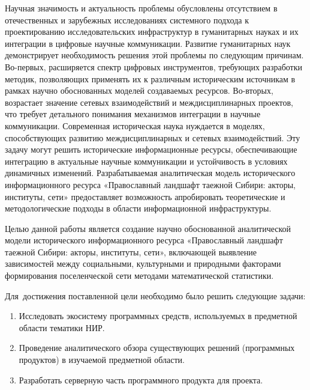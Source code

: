 
{\actuality}Научная значимость и актуальность проблемы обусловлены отсутствием в
отечественных и зарубежных исследованиях системного подхода к проектированию исследовательских инфраструктур в гуманитарных науках и их интеграции
в цифровые научные коммуникации. Развитие гуманитарных наук демонстрирует необходимость решения этой проблемы по следующим причинам. Во-первых,
расширяется спектр цифровых инструментов, требующих разработки методик,
позволяющих применять их к различным историческим источникам в рамках
научно обоснованных моделей создаваемых ресурсов. Во-вторых, возрастает значение сетевых взаимодействий и междисциплинарных проектов, что требует
детального понимания механизмов интеграции в научные коммуникации.
Современная историческая наука нуждается в моделях, способствующих
развитию междисциплинарных и сетевых взаимодействий. Эту задачу могут решить исторические информационные ресурсы, обеспечивающие интеграцию в
актуальные научные коммуникации и устойчивость в условиях динамичных изменений.
Разрабатываемая аналитическая модель исторического информационного
ресурса «Православный ландшафт таежной Сибири: акторы, институты, сети»
предоставляет возможность апробировать теоретические и методологические
подходы в области информационной инфраструктуры.


Целью данной работы является создание научно обоснованной аналитической модели исторического информационного ресурса «Православный ландшафт
таежной Сибири: акторы, институты, сети», включающей выявление зависимостей между социальными, культурными и природными факторами формирования
поселенческой сети методами математической статистики.

Для~достижения поставленной цели необходимо было решить следующие задачи:
\begin{enumerate}[beginpenalty=10000] %
  \item Исследовать экосистему программных средств, используемых в предметной области тематики НИР.
  \item Проведение аналитического обзора существующих решений (программных продуктов) в изучаемой предметной области.
  \item Разработать серверную часть программного продукта для проекта.
\end{enumerate}


